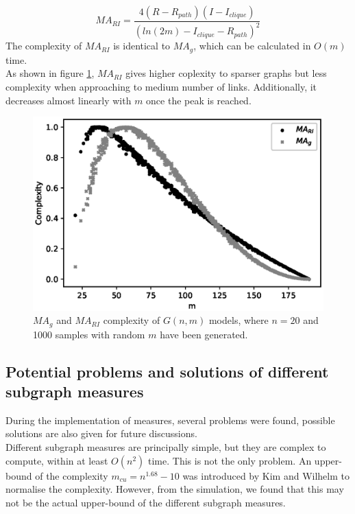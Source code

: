 \documentclass[12pt]{article}
\begin{document}
\begin{equation}
    MA_{RI} = \frac{4(R-R_{path})(I-I_{clique})}{(ln(2m)-I_{clique}-R_{path})^2}
\end{equation}
\noindent
The complexity of $MA_{RI}$ is identical to $MA_g$, which can be calculated in $O(m)$ time.\\
As shown in figure \ref{fig:mariandmag}, $MA_{RI}$ gives higher coplexity to sparser graphs but less complexity when approaching to medium number of links. Additionally, it decreases almost linearly with $m$ once the peak is reached.
\clearpage
\begin{figure}[ht]
    \label{fig:mariandmag}
    \centering
    \includegraphics[width=\textwidth]{mariandmag.eps}
    \caption{$MA_g$ and $MA_{RI}$ complexity of $G(n,m)$ models, where $n=20$ and 1000 samples with random $m$ have been generated.}
\end{figure}

\subsection{Potential problems and solutions of different subgraph measures}
\label{problem}
During the implementation of measures, several problems were found, possible solutions are also given for future discussions.\\
Different subgraph measures are principally simple, but they are complex to compute, within at least $O(n^2)$ time\cite{KIM20082637}. This is not the only problem. An upper-bound of the complexity $m_{cu} = n^{1.68}-10$ was introduced by Kim and Wilhelm\cite{KIM20082637} to normalise the complexity. However, from the simulation, we found that this may not be the actual upper-bound of the different subgraph measures.
\end{document}
